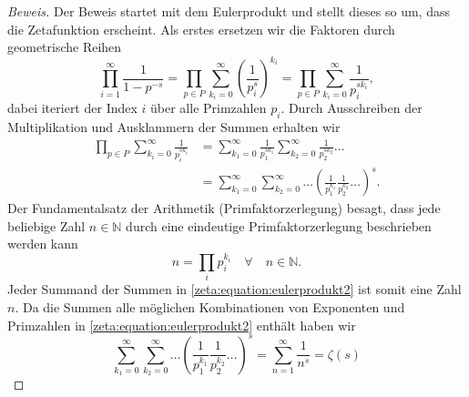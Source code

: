 \begin{proof}[Beweis]
    Der Beweis startet mit dem Eulerprodukt und stellt dieses so um, dass die Zetafunktion erscheint.
    Als erstes ersetzen wir die Faktoren durch geometrische Reihen
    \begin{equation}
        \prod_{i=1}^{\infty}
        \frac{1}{1-p^{-s}}
        =
        \prod_{p \in P}
        \sum_{k_i=0}^{\infty}
        \left(
        \frac{1}{p_i^s}
        \right)^{k_i}
        =
        \prod_{p \in P}
        \sum_{k_i=0}^{\infty}
        \frac{1}{p_i^{s k_i}},
    \end{equation}
    dabei iteriert der Index $i$ über alle Primzahlen $p_i$.
    Durch Ausschreiben der Multiplikation und Ausklammern der Summen erhalten wir
    \begin{align}
        \prod_{p \in P}
        \sum_{k_i=0}^{\infty}
        \frac{1}{p_i^{s k_i}}
        &=
        \sum_{k_1=0}^{\infty}
        \frac{1}{p_1^{s k_1}}
        \sum_{k_2=0}^{\infty}
        \frac{1}{p_2^{s k_2}}
        \ldots
        \nonumber \\
        &=
        \sum_{k_1=0}^{\infty}
        \sum_{k_2=0}^{\infty}
        \ldots
        \left(
        \frac{1}{p_1^{k_1}}
        \frac{1}{p_2^{k_2}}
        \ldots
        \right)^s.
        \label{zeta:equation:eulerprodukt2}
    \end{align}
    Der Fundamentalsatz der Arithmetik (Primfaktorzerlegung) besagt, dass jede beliebige Zahl $n \in \mathbb{N}$ durch eine eindeutige Primfaktorzerlegung beschrieben werden kann
    \begin{equation}
        n = \prod_i p_i^{k_i} \quad \forall \quad n \in \mathbb{N}.
    \end{equation}
    Jeder Summand der Summen in \eqref{zeta:equation:eulerprodukt2} ist somit eine Zahl $n$.
    Da die Summen alle möglichen Kombinationen von Exponenten und Primzahlen in \eqref{zeta:equation:eulerprodukt2} enthält haben wir
    \begin{equation}
        \sum_{k_1=0}^{\infty}
        \sum_{k_2=0}^{\infty}
        \ldots
        \left(
        \frac{1}{p_1^{k_1}}
        \frac{1}{p_2^{k_2}}
        \ldots
        \right)^s
        =
        \sum_{n=1}^\infty
        \frac{1}{n^s}
        =
        \zeta(s)
    \end{equation}
\end{proof}

